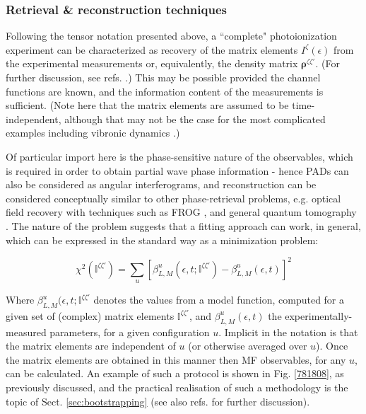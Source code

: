 \subsubsection{Retrieval \& reconstruction techniques}


Following the tensor notation presented above, a ``complete" photoionization experiment can be characterized as recovery of the matrix elements $I^{\zeta}(\epsilon)$ from the experimental measurements or, equivalently, the density matrix $\mathbf{\rho}^{\zeta\zeta'}$. (For further discussion, see refs. \cite{Reid2003,kleinpoppen2013perfect,hockett2018QMP1}.) This may be possible provided the channel functions are known, and the information content of the measurements is sufficient. (Note here that the matrix elements are assumed to be time-independent, although that may not be the case for the most complicated examples including vibronic dynamics \cite{hockett2018QMP2}.) 

Of particular import here is the phase-sensitive nature of the observables, which is required in order to obtain partial wave phase information - hence PADs can also be considered as angular interferograms, and reconstruction can be considered conceptually similar to other phase-retrieval problems, e.g. optical field recovery with techniques such as FROG \cite{trebino2000FrequencyResolvedOpticalGating}, and general quantum tomography \cite{MauroDAriano2003}. The nature of the problem suggests that a fitting approach can work, in general, which can be expressed in the standard way as a minimization problem:

\begin{equation}
\chi^{2}(\mathbb{I}^{\zeta\zeta'})=\sum_{u}\left[\beta^{u}_{L,M}(\epsilon,t;\mathbb{I}^{\zeta\zeta'})-\beta^{u}_{L,M}(\epsilon,t)\right]^{2}\label{eq:chi2-I}
\end{equation}

Where $\beta^{u}_{L,M}(\epsilon,t;\mathbb{I}^{\zeta\zeta'}$ denotes  the values from a model function, computed for a given set of (complex) matrix elements $\mathbb{I}^{\zeta\zeta'}$, and $\beta^{u}_{L,M}(\epsilon,t)$ the experimentally-measured parameters, for a given configuration $u$. Implicit in the notation is that the matrix elements are independent of $u$ (or otherwise averaged over $u$). Once the matrix elements are obtained in this manner then MF observables, for any $u$, can be calculated. An example of such a protocol is shown in Fig. \ref{781808}, as previously discussed, and the practical realisation of such a methodology is the topic of Sect. \ref{sec:bootstrapping} (see also refs. \cite{hockett2018QMP2, marceau2017MolecularFrameReconstruction} for further discussion).

